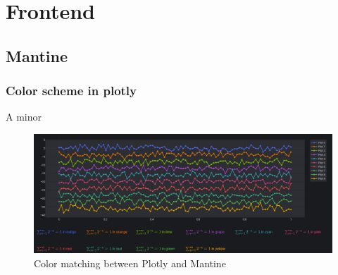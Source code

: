 \section{Frontend}
\subsection{Mantine}

\subsubsection{Color scheme in plotly}
A minor
\begin{figure}[H]
    \centering
    \includegraphics[width=\textwidth]{figures/gui/colors.png}
    \caption{Color matching between Plotly and Mantine}
    \label{fig:color_matching}
\end{figure}